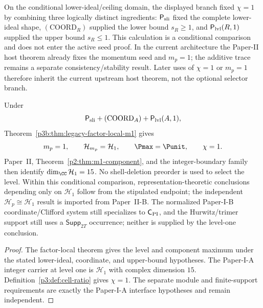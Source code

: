 \documentclass[11pt,a4paper]{article}
\begin{document}
\begin{remark}
\label{p3:rem:cell-constitution-gap-closed}
On the conditional lower-ideal/ceiling domain, the displayed branch fixed
\(\chi=1\) by combining three logically distinct ingredients:
\(\mathsf P_{\rm sli}\) fixed the complete lower-ideal shape,
\((\mathrm{COORD}_R)\) supplied the lower bound \(s_R\ge1\), and
\(\mathsf P_{\rm lvl}(R,1)\) supplied the upper bound \(s_R\le1\).
This calculation is a conditional comparison and does not enter the active seed proof.
In the current architecture the Paper-II host theorem already fixes the
momentum seed and \(m_p=1\); the additive trace remains a separate
consistency/stability result.  Later uses of \(\chi=1\) or \(m_p=1\)
therefore inherit the current upstream host theorem, not the optional selector
branch.
\end{remark}

\begin{theorem}
\label{p3b:thm:legacy-level-one-handoff}
Under
\[
 \mathsf P_{\rm sli}+(\mathrm{COORD}_A)+\mathsf P_{\rm lvl}(A,1),
\]
Theorem~\ref{p3b:thm:legacy-factor-local-m1} gives
\[
 m_p=1,
 \qquad
 \mathcal H_{m_p}=\mathcal H_1,
 \qquad
 \Pmax=\Punit,
 \qquad
 \chi=1.
\]
Paper~II, Theorem~\ref{p2:thm:m1-component}, and the integer-boundary family
then identify \(\dim_{\CC}\mathcal H_1=15\).  No shell-deletion preorder is
used to select the level. Within this conditional comparison, representation-theoretic conclusions depending only on \(\mathcal H_1\) follow from the stipulated endpoint; the independent \(\mathcal H_p\cong\mathcal H_1\) result is imported from Paper~II-B. The normalized Paper-I-B
coordinate/Clifford system still specializes to \(\mathsf C_{\rm PI}\), and
the Hurwitz/trimer support still uses a \(\mathsf{Supp}_{2T}\) occurrence;
neither is supplied by the level-one conclusion.
\end{theorem}

\begin{proof}
The factor-local theorem gives the level and component maximum under the
stated lower-ideal, coordinate, and upper-bound hypotheses.  The Paper-I-A
integer carrier at level one is \(\mathcal H_1\) with complex dimension
\(15\).  Definition~\ref{p3:def:cell-ratio} gives \(\chi=1\).  The separate
module and finite-support requirements are exactly the Paper-I-A interface
hypotheses and remain independent.
\end{proof}
\end{document}
